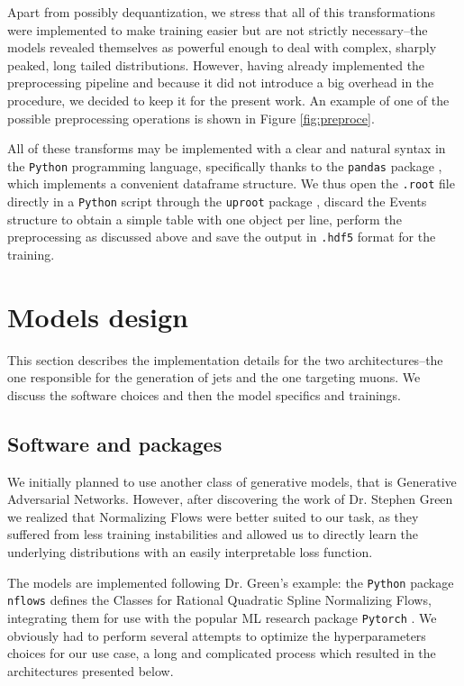 Apart from possibly dequantization, we stress that all of this transformations were implemented to make training easier but are not strictly necessary--the models revealed themselves as powerful enough to deal with complex, sharply peaked, long tailed distributions. However, having already implemented the preprocessing pipeline and because it did not introduce a big overhead in the procedure, we decided to keep it for the present work. An example of one of the possible preprocessing operations is shown in Figure \ref{fig:preproce}.

All of these transforms may be implemented with a clear and natural syntax in the \texttt{Python} programming language, specifically thanks to the \texttt{pandas} package \cite{reback2020pandas}, which implements a convenient dataframe structure. We thus open the \texttt{.root} file directly in a \texttt{Python} script through the \texttt{uproot} package \cite{jim_pivarski_2022_6791281}, discard the Events structure to obtain a simple table with one object per line, perform the preprocessing as discussed above and save the output in \texttt{.hdf5} format for the training.

\section{Models design}
This section describes the implementation  details for the two architectures--the one responsible for the generation of jets and the one targeting muons. We discuss the software choices and then the model specifics and trainings.

\subsection{Software and packages}

We initially planned to use another class of generative models, that is Generative Adversarial Networks. However, after discovering the work of Dr. Stephen Green \cite{stephen_green_2021_4558988} we realized that Normalizing Flows were better suited to our task, as they suffered from less training instabilities and allowed us to directly learn the underlying distributions with an easily interpretable loss function.

The models are implemented following Dr. Green's example: the \texttt{Python} package \texttt{nflows} \cite{conor_durkan_2020_4296287} defines the Classes for Rational Quadratic Spline Normalizing Flows, integrating them for use with the popular ML research package \texttt{Pytorch} \cite{NEURIPS2019_9015}. We obviously had to perform several attempts to optimize the hyperparameters choices for our use case, a long and complicated process which resulted in the architectures presented below.

